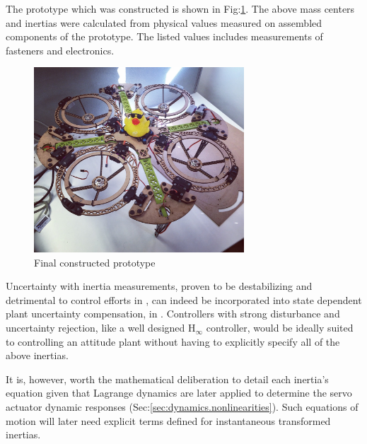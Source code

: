 The prototype which was constructed is shown in Fig:\ref{fig:ducky}. The above mass centers and inertias were calculated from physical values measured on assembled components of the prototype. The listed values includes measurements of fasteners and electronics.
\begin{figure}[hbtp]
\centering
\includegraphics[width=0.7\textwidth]{figs/ducky}
\vspace{-6pt}
\caption{Final constructed prototype}
\vspace{-12pt}
\label{fig:ducky}
\end{figure}
\par
Uncertainty with inertia measurements, proven to be destabilizing and detrimental to control efforts in \cite{inertiafree,inertiaspin}, can indeed be incorporated into state dependent plant uncertainty  compensation, in \cite{intelligentbackstep}. Controllers with strong disturbance and uncertainty rejection, like a well designed $\text{H}_\infty$ controller, would be ideally suited to controlling an attitude plant without having to explicitly specify all of the above inertias. 
\par
It is, however, worth the mathematical deliberation to detail each inertia's equation given that Lagrange dynamics are later applied to determine the servo actuator dynamic responses (Sec:\ref{sec:dynamics.nonlinearities}). Such equations of motion will later need explicit terms defined for instantaneous transformed inertias.
\newpage
